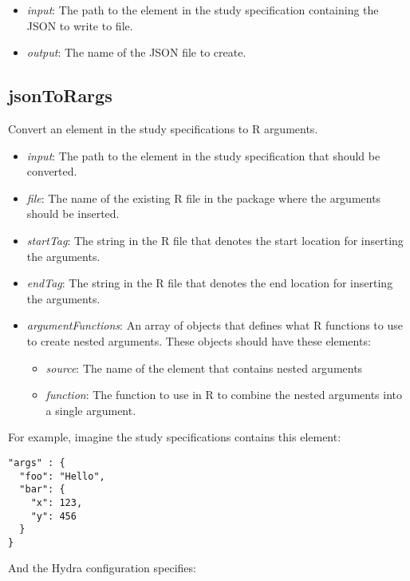 \documentclass[]{article}
\providecommand{\tightlist}{%
  \setlength{\itemsep}{0pt}\setlength{\parskip}{0pt}}
\begin{document}
\begin{itemize}
\tightlist
\item
  \emph{input}: The path to the element in the study specification
  containing the JSON to write to file.
\item
  \emph{output}: The name of the JSON file to create.
\end{itemize}

\hypertarget{jsontorargs}{%
\subsection{jsonToRargs}\label{jsontorargs}}

Convert an element in the study specifications to R arguments.

\begin{itemize}
\tightlist
\item
  \emph{input}: The path to the element in the study specification that
  should be converted.
\item
  \emph{file}: The name of the existing R file in the package where the
  arguments should be inserted.
\item
  \emph{startTag}: The string in the R file that denotes the start
  location for inserting the arguments.
\item
  \emph{endTag}: The string in the R file that denotes the end location
  for inserting the arguments.
\item
  \emph{argumentFunctions}: An array of objects that defines what R
  functions to use to create nested arguments. These objects should have
  these elements:

  \begin{itemize}
  \tightlist
  \item
    \emph{source}: The name of the element that contains nested
    arguments
  \item
    \emph{function}: The function to use in R to combine the nested
    arguments into a single argument.
  \end{itemize}
\end{itemize}

For example, imagine the study specifications contains this element:

\begin{verbatim}
"args" : {
  "foo": "Hello",
  "bar": {
    "x": 123,
    "y": 456
  }
}
\end{verbatim}

And the Hydra configuration specifies:
\end{document}
